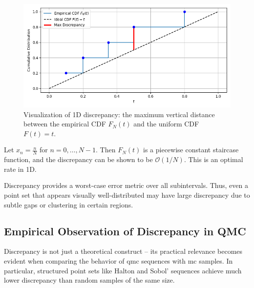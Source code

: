 \begin{figure}[H]
\centering
\includegraphics[scale=.67]{Figures/discrepancy1d.png}
\caption{Visualization of 1D discrepancy: the maximum vertical distance between the empirical CDF $F_N(t)$ and the uniform CDF $F(t) = t$.}
\label{fig:discrepancy-1d}
\end{figure}

\begin{example}
Let $x_n = \frac{n}{N}$ for $n = 0, \dots, N-1$. Then $F_N(t)$ is a
piecewise constant staircase function, and the discrepancy can be shown to be
$\mathcal{O}(1/N)$. This is an optimal rate in 1D.
\end{example}

\begin{remark}
Discrepancy provides a worst-case error metric over all subintervals. Thus, even
a point set that appears visually well-distributed may have large discrepancy
due to subtle gaps or clustering in certain regions.
\end{remark}

\subsection{Empirical Observation of Discrepancy in QMC}

Discrepancy is not just a theoretical construct -- its practical relevance
becomes evident when comparing the behavior of \ac{qmc} sequences with \ac{mc}
samples. In particular, structured point sets like Halton and Sobol' sequences
achieve much lower discrepancy than random samples of the same size.

